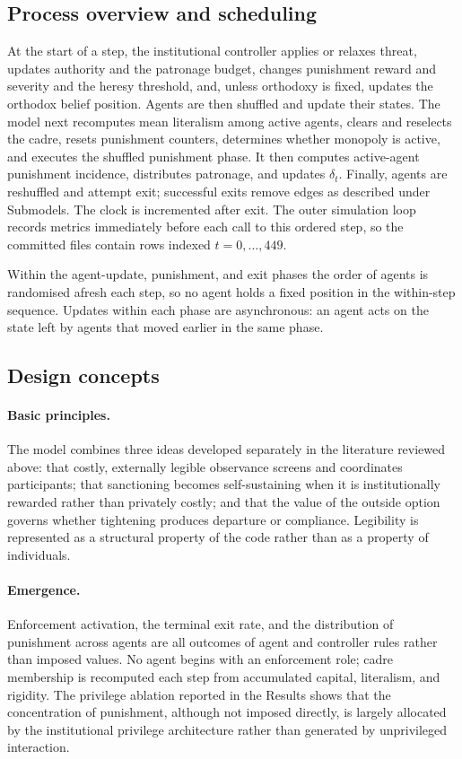\documentclass[12pt]{article}
\begin{document}
\subsection{Process overview and scheduling}

At the start of a step, the institutional controller applies or relaxes threat,
updates authority and the patronage budget, changes punishment reward and
severity and the heresy threshold, and, unless orthodoxy is fixed, updates the
orthodox belief position. Agents are then shuffled and update their states. The
model next recomputes mean literalism among active agents, clears and reselects
the cadre, resets punishment counters, determines whether monopoly is active,
and executes the shuffled punishment phase. It then computes active-agent
punishment incidence, distributes patronage, and updates \(\delta_t\). Finally,
agents are reshuffled and attempt exit; successful exits remove edges as
described under Submodels. The clock is incremented after exit. The outer
simulation loop records metrics immediately before each call to this ordered
step, so the committed files contain rows indexed \(t=0,\ldots,449\).

Within the agent-update, punishment, and exit phases the order of agents is
randomised afresh each step, so no agent holds a fixed position in the
within-step sequence. Updates within each phase are asynchronous: an agent acts
on the state left by agents that moved earlier in the same phase.

\subsection{Design concepts}

\paragraph{Basic principles.} The model combines three ideas developed
separately in the literature reviewed above: that costly, externally legible
observance screens and coordinates participants; that sanctioning becomes
self-sustaining when it is institutionally rewarded rather than privately
costly; and that the value of the outside option governs whether tightening
produces departure or compliance. Legibility is represented as a structural
property of the code rather than as a property of individuals.

\paragraph{Emergence.} Enforcement activation, the terminal exit rate, and the
distribution of punishment across agents are all outcomes of agent and
controller rules rather than imposed values. No agent begins with an enforcement
role; cadre membership is recomputed each step from accumulated capital,
literalism, and rigidity. The privilege ablation reported in the Results shows
that the concentration of punishment, although not imposed directly, is largely
allocated by the institutional privilege architecture rather than generated by
unprivileged interaction.
\end{document}
